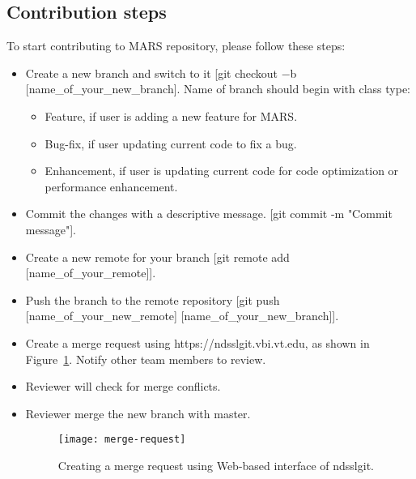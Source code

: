 \subsection{Contribution steps}
To start contributing to MARS repository, please follow these steps:
\begin{itemize}
\item Create a new branch and switch to it [git checkout $-$b [name\_of\_your\_new\_branch]. Name of branch should begin with class type:
\begin{itemize}
\item Feature, if user is adding a new feature for MARS.
\item Bug-fix, if user updating current code to fix a bug.
\item Enhancement, if user is updating current code for code optimization or performance enhancement.
\end{itemize} 

\item Commit the changes with a  descriptive message. [git commit -m "Commit message"]. 
\item Create a new remote for your branch [git remote add [name\_of\_your\_remote]].
\item Push the branch to the remote repository [git push [name\_of\_your\_new\_remote] [name\_of\_your\_new\_branch]].
\item Create a merge request using https://ndsslgit.vbi.vt.edu, as shown in Figure~\ref{fig:merge-request}. Notify other team members to review.
\item Reviewer will check for merge conflicts.
\item Reviewer merge the new branch with master.

\begin{figure}[H]
\centering
\texttt{[image: merge-request]}
\caption{
Creating a merge request using Web-based interface of ndsslgit.
}   %
\label{fig:merge-request}
\end{figure}

\end{itemize}



